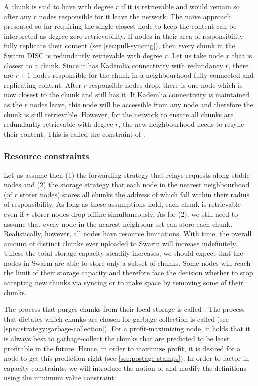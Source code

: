 A chunk is said to have  with degree $r$ if it is retrievable and would remain so after any $r$ nodes responsible for it leave the network. The naive approach presented so far requiring the single closest node to keep the content can be interpreted as degree zero retrievability. If nodes in their area of responsibility fully replicate  their content (see \ref{sec:pull-syncing}), then every chunk in the Swarm DISC is redundantly retrievable with degree $r$. Let us take node $x$ that is closest to a chunk. Since it has Kademlia connectivity with redundancy $r$, there are $r+1$ nodes responsible for the chunk in a neighbourhood fully connected and replicating content. After $r$ responsible nodes drop, there is one node which is now closest to the chunk and still has it. If Kademlia connectivity is maintained as the $r$ nodes leave, this node will be accessible from any node and therefore the chunk is still retrievable. However, for the network to ensure all chunks are redundantly retrievable with degree $r$, the new neighbourhood needs to resync their content. This is called the constraint of .

\subsubsection{Resource constraints}

Let us assume then (1) the forwarding strategy that relays requests along stable nodes and (2) the storage strategy that each node in the nearest neighbourhood (of $r$ storer nodes) stores all chunks the address of which fall within their radius of responsibility. As long as these assumptions hold, each chunk is retrievable even if $r$ storer nodes drop offline simultaneously. As for (2), we still need to assume that every node in the nearest neighbour set can store each chunk. Realistically, however, all nodes have resource limitations. With time, the overall amount of distinct chunks ever uploaded to Swarm will increase indefinitely. Unless the total storage capacity steadily increases, we should expect that the nodes in Swarm are able to store only a subset of chunks. Some nodes will reach the limit of their storage capacity and therefore face the decision whether to stop accepting new chunks via syncing or to make space by removing some of their chunks. 

The process that purges chunks from their local storage is called . The process that dictates which chunks are chosen for garbage collection is called  (see  \ref{spec:strategy:garbage-collection}). For a profit-maximizing node, it holds that it is always best to garbage-collect the chunks that are predicted to be least profitable in the future. Hence, in order to maximize profit, it is desired for a node to get this prediction right (see \ref{sec:postage-stamps}). In order to factor in capacity constraints, we will introduce the notion of  and modify the definitions using the minimum value constraint:

